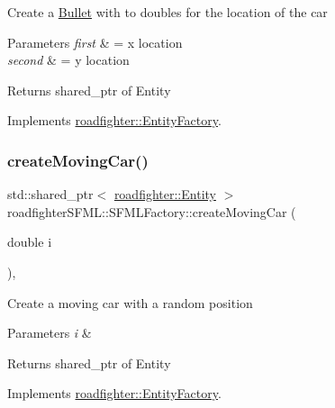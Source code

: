 Create a \hyperlink{classroadfighterSFML_1_1Bullet}{Bullet} with to doubles for the location of the car 
\begin{DoxyParams}{Parameters}
{\em first} & = x location \\
\hline
{\em second} & = y location \\
\hline
\end{DoxyParams}
\begin{DoxyReturn}{Returns}
shared\+\_\+ptr of Entity 
\end{DoxyReturn}


Implements \hyperlink{classroadfighter_1_1EntityFactory_a2d4319aef20024f83e7c3189e92c89e1}{roadfighter\+::\+Entity\+Factory}.

\mbox{\label{classroadfighterSFML_1_1SFMLFactory_aa1aeba2d2613b784d9da5f6fd3109154}} 
\subsubsection{\texorpdfstring{create\+Moving\+Car()}{createMovingCar()}}
{\footnotesize\ttfamily std\+::shared\+\_\+ptr$<$ \hyperlink{classroadfighter_1_1Entity}{roadfighter\+::\+Entity} $>$ roadfighter\+S\+F\+M\+L\+::\+S\+F\+M\+L\+Factory\+::create\+Moving\+Car (\begin{DoxyParamCaption}\item[{double}]{i }\end{DoxyParamCaption})\hspace{0.3cm}{\ttfamily [override]}, {\ttfamily [virtual]}}

Create a moving car with a random position 
\begin{DoxyParams}{Parameters}
{\em i} & \\
\hline
\end{DoxyParams}
\begin{DoxyReturn}{Returns}
shared\+\_\+ptr of Entity 
\end{DoxyReturn}


Implements \hyperlink{classroadfighter_1_1EntityFactory_a53cc68cc3f7365e4ded258ea9b281b45}{roadfighter\+::\+Entity\+Factory}.

\mbox{\label{classroadfighterSFML_1_1SFMLFactory_a9960aec21f58babf83857cc400dad8fe}} 
